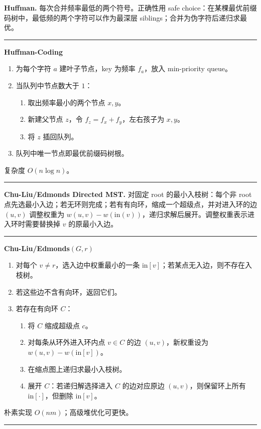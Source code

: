 \documentclass[UTF8,a4paper,11pt]{ctexart}
\newenvironment{algobox}[1]
{\par\medskip\noindent\begin{minipage}{0.96\linewidth}\hrule\vspace{0.35em}\textbf{#1}\par\vspace{0.25em}\small}
{\par\vspace{0.25em}\hrule\end{minipage}\par\medskip}
\begin{document}
\textbf{Huffman.} 每次合并频率最低的两个符号。正确性用 safe choice：在某棵最优前缀码树中，最低频的两个字符可以作为最深层 siblings；合并为伪字符后递归求最优。

\begin{algobox}{Huffman-Coding}
\begin{enumerate}
  \item 为每个字符 $a$ 建叶子节点，key 为频率 $f_a$，放入 min-priority queue。
  \item 当队列中节点数大于 $1$：
  \begin{enumerate}
    \item 取出频率最小的两个节点 $x,y$。
    \item 新建父节点 $z$，令 $f_z=f_x+f_y$，左右孩子为 $x,y$。
    \item 将 $z$ 插回队列。
  \end{enumerate}
  \item 队列中唯一节点即最优前缀码树根。
\end{enumerate}
复杂度 $O(n\log n)$。
\end{algobox}

\textbf{Chu-Liu/Edmonds Directed MST.} 对固定 root 的最小入枝树：每个非 root 点先选最小入边；若无环则完成；若有有向环，缩成一个超级点，并对进入环的边 $(u,v)$ 调整权重为 $w(u,v)-w(\mathrm{in}(v))$，递归求解后展开。调整权重表示进入环时需要替换掉 $v$ 的原最小入边。

\begin{algobox}{Chu-Liu/Edmonds$(G,r)$}
\begin{enumerate}
  \item 对每个 $v\ne r$，选入边中权重最小的一条 $\mathrm{in}[v]$；若某点无入边，则不存在入枝树。
  \item 若这些边不含有向环，返回它们。
  \item 若存在有向环 $C$：
  \begin{enumerate}
    \item 将 $C$ 缩成超级点 $c$。
    \item 对每条从环外进入环内点 $v\in C$ 的边 $(u,v)$，新权重设为 $w(u,v)-w(\mathrm{in}[v])$。
    \item 在缩点图上递归求最小入枝树。
    \item 展开 $C$：若递归解选择进入 $C$ 的边对应原边 $(u,v)$，则保留环上所有 $\mathrm{in}[\cdot]$，但删除 $\mathrm{in}[v]$。
  \end{enumerate}
\end{enumerate}
朴素实现 $O(nm)$；高级堆优化可更快。
\end{algobox}
\end{document}
